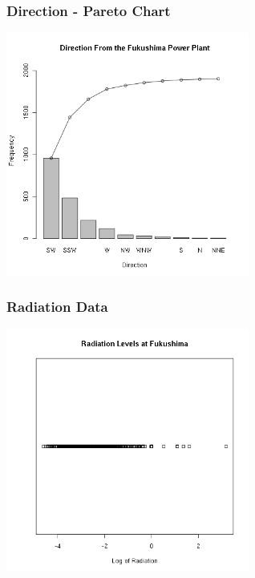 \begin{frame}
  \frametitle{Direction - Pareto Chart}

  \begin{center}
    \includegraphics[width=8cm]{img/fukushimaParetoDirection}
  \end{center}

\end{frame}

\begin{frame}
  \frametitle{Radiation Data}

  \begin{center}
    \includegraphics[width=8cm]{img/logFukushimaGamma}
  \end{center}  

\end{frame}

